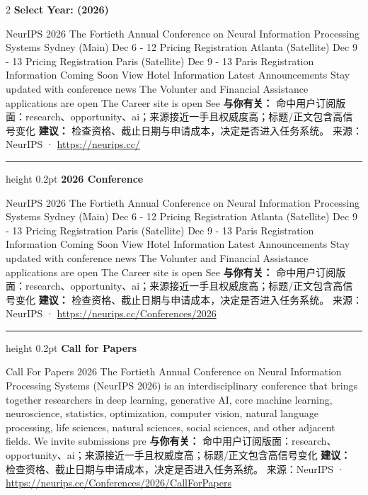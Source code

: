 \documentclass[10.5pt]{ctexart}
\begin{document}
\begin{multicols}{2}
{\large\bfseries Select Year: (2026)}\par
NeurIPS 2026 The Fortieth Annual Conference on Neural Information Processing Systems Sydney (Main) Dec 6 - 12 Pricing Registration Atlanta (Satellite) Dec 9 - 13 Pricing Registration Paris (Satellite) Dec 9 - 13 Paris Registration Information Coming Soon View Hotel Information Latest Announcements Stay updated with conference news The Volunter and Financial Assistance applications are open The Career site is open See
\textbf{与你有关：} 命中用户订阅版面：research、opportunity、ai；来源接近一手且权威度高；标题/正文包含高信号变化
\textbf{建议：} 检查资格、截止日期与申请成本，决定是否进入任务系统。
{\footnotesize\color{ormuted} 来源：NeurIPS · \url{https://neurips.cc/}}
\vspace{2mm}
\hrule height 0.2pt
\vspace{2mm}
{\large\bfseries 2026 Conference}\par
NeurIPS 2026 The Fortieth Annual Conference on Neural Information Processing Systems Sydney (Main) Dec 6 - 12 Pricing Registration Atlanta (Satellite) Dec 9 - 13 Pricing Registration Paris (Satellite) Dec 9 - 13 Paris Registration Information Coming Soon View Hotel Information Latest Announcements Stay updated with conference news The Volunter and Financial Assistance applications are open The Career site is open See
\textbf{与你有关：} 命中用户订阅版面：research、opportunity、ai；来源接近一手且权威度高；标题/正文包含高信号变化
\textbf{建议：} 检查资格、截止日期与申请成本，决定是否进入任务系统。
{\footnotesize\color{ormuted} 来源：NeurIPS · \url{https://neurips.cc/Conferences/2026}}
\vspace{2mm}
\hrule height 0.2pt
\vspace{2mm}
{\large\bfseries Call for Papers}\par
Call For Papers 2026 The Fortieth Annual Conference on Neural Information Processing Systems (NeurIPS 2026) is an interdisciplinary conference that brings together researchers in deep learning, generative AI, core machine learning, neuroscience, statistics, optimization, computer vision, natural language processing, life sciences, natural sciences, social sciences, and other adjacent fields. We invite submissions pre
\textbf{与你有关：} 命中用户订阅版面：research、opportunity、ai；来源接近一手且权威度高；标题/正文包含高信号变化
\textbf{建议：} 检查资格、截止日期与申请成本，决定是否进入任务系统。
{\footnotesize\color{ormuted} 来源：NeurIPS · \url{https://neurips.cc/Conferences/2026/CallForPapers}}

\end{multicols}
\end{document}

